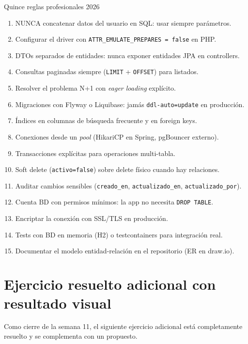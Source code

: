 \documentclass[11pt,a4paper,openany]{book}
\begin{document}
\begin{cajabuenas}{Quince reglas profesionales 2026}
\begin{enumerate}
\item NUNCA concatenar datos del usuario en SQL: usar siempre
parámetros.
\item Configurar el driver con \texttt{ATTR\_EMULATE\_PREPARES = false}
en PHP.
\item DTOs separados de entidades: nunca exponer entidades JPA en
controllers.
\item Consultas paginadas siempre (\texttt{LIMIT} + \texttt{OFFSET})
para listados.
\item Resolver el problema N+1 con \emph{eager loading} explícito.
\item Migraciones con Flyway o Liquibase: jamás
\texttt{ddl-auto=update} en producción.
\item Índices en columnas de búsqueda frecuente y en foreign keys.
\item Conexiones desde un \emph{pool} (HikariCP en Spring, pgBouncer
externo).
\item Transacciones explícitas para operaciones multi-tabla.
\item Soft delete (\texttt{activo=false}) sobre delete físico cuando
hay relaciones.
\item Auditar cambios sensibles (\texttt{creado\_en},
\texttt{actualizado\_en}, \texttt{actualizado\_por}).
\item Cuenta BD con permisos mínimos: la app no necesita
\texttt{DROP TABLE}.
\item Encriptar la conexión con SSL/TLS en producción.
\item Tests con BD en memoria (H2) o testcontainers para integración
real.
\item Documentar el modelo entidad-relación en el repositorio
(ER en draw.io).
\end{enumerate}
\end{cajabuenas}

\section{Ejercicio resuelto adicional con resultado visual}

Como cierre de la semana 11, el siguiente ejercicio adicional
está completamente resuelto y se complementa con un propuesto.
\end{document}
